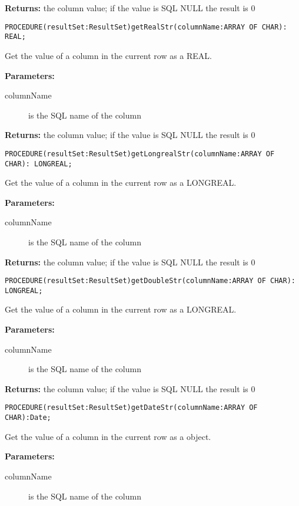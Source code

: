      {\bf Returns: } 
          the column value; if the value is SQL NULL the result is 0 


\verb'PROCEDURE(resultSet:ResultSet)getRealStr(columnName:ARRAY OF CHAR): REAL;'

     Get the value of a column in the current row as a REAL. 

     {\bf Parameters: } 
\begin{description}
\item[columnName] is the SQL name of the column 
\end{description}

     {\bf Returns: } 
          the column value; if the value is SQL NULL the result is 0 


\verb'PROCEDURE(resultSet:ResultSet)getLongrealStr(columnName:ARRAY OF CHAR): LONGREAL;'

     Get the value of a column in the current row as a LONGREAL. 

     {\bf Parameters: } 
\begin{description}
\item[columnName] is the SQL name of the column 
\end{description}

     {\bf Returns: } 
          the column value; if the value is SQL NULL the result is 0 


\verb'PROCEDURE(resultSet:ResultSet)getDoubleStr(columnName:ARRAY OF CHAR): LONGREAL;'

     Get the value of a column in the current row as a LONGREAL. 

     {\bf Parameters: } 
\begin{description}
\item[columnName] is the SQL name of the column 
\end{description}

     {\bf Returns: } 
          the column value; if the value is SQL NULL the result is 0 


\verb'PROCEDURE(resultSet:ResultSet)getDateStr(columnName:ARRAY OF CHAR):Date;'

     Get the value of a column in the current row as a  object. 

     {\bf Parameters: } 
\begin{description}
\item[columnName] is the SQL name of the column 
\end{description}

